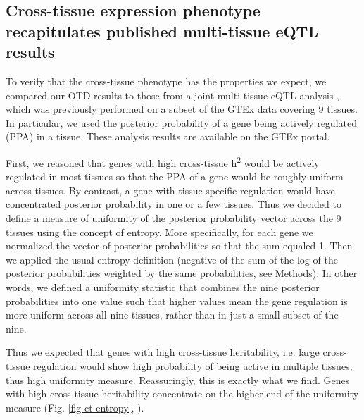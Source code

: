 \documentclass[10pt,letterpaper]{article}
\begin{document}
\subsection*{Cross-tissue expression phenotype recapitulates published multi-tissue eQTL results}

To verify that the cross-tissue phenotype has the properties we expect, we compared our OTD results to those from a joint multi-tissue eQTL analysis  \cite{Flutre_2013}, which was previously performed on a subset of the GTEx data \cite{Ardlie_2015} covering 9 tissues. In particular, we used the posterior probability of a gene being actively regulated (PPA) in a tissue. These analysis results are available on the GTEx portal.

First, we reasoned that genes with high cross-tissue h\textsuperscript{2} would be actively regulated in most tissues so that the PPA of a gene would be roughly uniform across tissues. By contrast, a gene with tissue-specific regulation would have concentrated posterior probability in one or a few tissues. Thus we decided to define a measure of uniformity of the posterior probability vector across the 9 tissues using the concept of entropy. More specifically, for each gene we normalized the vector of posterior probabilities so that the sum equaled 1. Then we applied the usual entropy definition (negative of the sum of the log of the posterior probabilities weighted by the same probabilities, see Methods). In other words, we defined a uniformity statistic that combines the nine posterior probabilities into one value such that higher values mean the gene regulation is more uniform across all nine tissues, rather than in just a small subset of the nine.

Thus we expected that genes with high cross-tissue heritability, i.e. large cross-tissue regulation would show high probability of being active in multiple tissues, thus high uniformity measure. Reassuringly, this is exactly what we find.
Genes with high cross-tissue heritability concentrate on the higher end of the uniformity measure (Fig. \ref{fig-ct-entropy}, ). 
\end{document}
